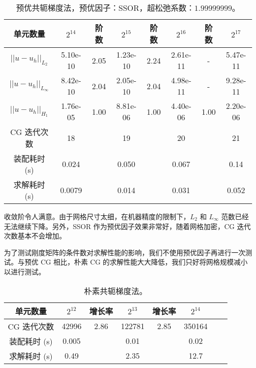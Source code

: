 \documentclass[lang=cn,11pt,a4paper]{elegantpaper}
\begin{document}
\begin{table}[H]
    \centering
    \begin{tabular}{|c|c|c|c|c|c|c|c|}
    \hline
    单元数量                    & $2^{14}$ & 阶数 & $2^{15}$ & 阶数 & $2^{16}$ & 阶数 & $2^{17}$ \\ \hline
    $||u-u_h||_{L_2}$      & 5.10e-10     & 2.05 & 1.23e-10     & 2.24 & 2.61e-11     & - & 5.47e-11     \\ \hline
    $||u-u_h||_{L_\infty}$ & 8.42e-10     & 2.04 & 2.05e-10     & 2.04 & 4.98e-11     & - & 9.28e-11     \\ \hline
    $||u-u_h||_{H_1}$      & 1.76e-05     & 1.00 & 8.81e-06     & 1.00 & 4.40e-06     & 1.00 & 2.20e-06     \\ \hline
    CG 迭代次数            & 18 & & 19 & & 20 & & 21\\    
\hline
    装配耗时 (s)           & 0.024         &      & 0.050          &      & 0.067           &      & 0.14     \\ \hline
    求解耗时 (s)           & 0.0079         &      & 0.014          &      & 0.031           &      & 0.052     \\ \hline
    \end{tabular}
    \caption{\small 预优共轭梯度法，预优因子：SSOR，超松弛系数：$1.99999999$。}
\end{table}

收敛阶令人满意。由于网格尺寸太细，在机器精度的限制下，$L_2$ 和 $L_\infty$ 范数已经无法继续下降。另外，SSOR 作为预优因子效果非常好，随着网格加密，CG 迭代次数基本不会增加。

为了测试刚度矩阵的条件数对求解性能的影响，我们不使用预优因子再进行一次测试。与预优 CG 相比，朴素 CG 的求解性能大大降低，我们只好将网格规模减小以进行测试。

\begin{table}[H]
    \centering
    \begin{tabular}{|c|c|c|c|c|c|c|c|}
    \hline
    单元数量                    & $2^{12}$ & 增长率 & $2^{13}$ & 增长率 & $2^{14}$ \\ \hline
    CG 迭代次数            & 42996 & 2.86 & 122781 & 2.85 & 350164\\    
\hline
    装配耗时 (s)           & 0.005          &      & 0.01           &      & 0.02     \\ \hline
    求解耗时 (s)           & 0.49          &      & 2.35           &      & 12.7     \\ \hline
    \end{tabular}
    \caption{\small 朴素共轭梯度法。}
\end{table}

\appendix
\addappheadtotoc
\end{document}
